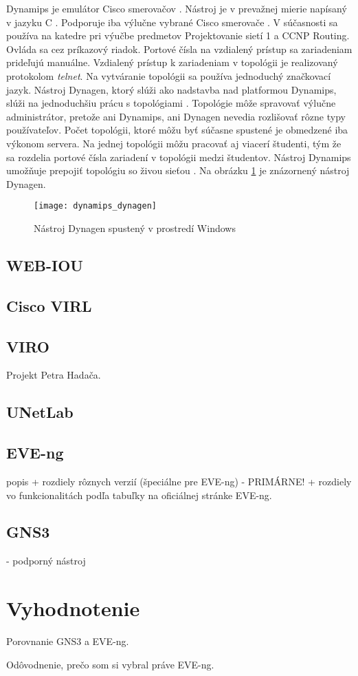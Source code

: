 Dynamips je emulátor Cisco smerovačov \cite{dynamips}. Nástroj je v prevažnej mierie napísaný v jazyku C \cite{dynamips_github}. Podporuje iba výlučne vybrané Cisco smerovače \cite{dynamips}. V súčasnosti sa používa na katedre pri výučbe predmetov Projektovanie sietí 1 a CCNP Routing. Ovláda sa cez príkazový riadok. Portové čísla na vzdialený prístup sa zariadeniam prideľujú manuálne. Vzdialený prístup k zariadeniam v topológii je realizovaný protokolom \emph{telnet}. Na vytváranie topológii sa používa jednoduchý značkovací jazyk. Nástroj Dynagen, ktorý slúži ako nadstavba nad platformou Dynamips, slúži na jednoduchšiu prácu s topológiami \cite{dynamips}. Topológie môže spravovať výlučne administrátor, pretože ani Dynamips, ani Dynagen nevedia rozlišovať rôzne typy používateľov. Počet topológii, ktoré môžu byť súčasne spustené je obmedzené iba výkonom servera. Na jednej topológii môžu pracovať aj viacerí študenti, tým že sa rozdelia portové čísla zariadení v topológii medzi študentov. Nástroj Dynamips umožňuje prepojiť topológiu so živou sieťou \cite{dynamips, dynamips_nil}. Na obrázku \ref{obr:dynamips_dynagen} je znázornený nástroj Dynagen.

\begin{figure}
    \centering
    \texttt{[image: dynamips\_dynagen]}
    \caption{Nástroj Dynagen spustený v prostredí Windows} \cite{obr_dynamips_dynagen}
    \label{obr:dynamips_dynagen}
\end{figure}

\subsection{WEB-IOU}



\subsection{Cisco VIRL}

\subsection{VIRO}

Projekt Petra Hadača.

\subsection{UNetLab}

\subsection{EVE-ng}

popis + rozdiely rôznych verzií (špeciálne pre EVE-ng) - PRIMÁRNE! + rozdiely vo funkcionalitách podľa tabuľky na oficiálnej stránke EVE-ng.

\subsection{GNS3}

- podporný nástroj

\section{Vyhodnotenie}

Porovnanie GNS3 a EVE-ng.

Odôvodnenie, prečo som si vybral práve EVE-ng.